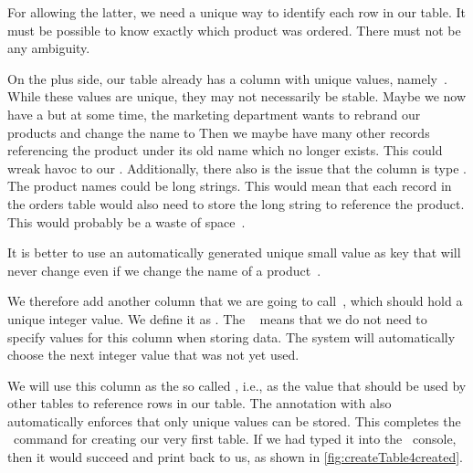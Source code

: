 For allowing the latter, we need a unique way to identify each row in our table.
It must be possible to know exactly which product was ordered.
There must not be any ambiguity.

On the plus side, our table already has a column with unique values, namely~.
While these values are unique, they may not necessarily be stable.
Maybe we now have a  but at some time, the marketing department wants to rebrand our products and change the name to 
Then we maybe have many other records referencing the product under its old name which no longer exists.
This could wreak havoc to our \db.
Additionally, there also is the issue that the column  is type .
The product names could be long strings.
This would mean that each record in the orders table would also need to store the long  string to reference the product.
This would probably be a waste of space~\cite{SE:DA:2014VPKM}.

It is better to use an automatically generated unique small value as key that will never change even if we change the name of a product~\cite{B2025DS:SBPASG}.%
%
\begin{sloppypar}%
We therefore add another column that we are going to call~, which should hold a unique integer value.
We define it as .
The ~\cite{PGDG:PD:IC,PGDG:PD:GC} means that we do not need to specify values for this column when storing data.
The system will automatically choose the next integer value that was not yet used.%
\end{sloppypar}%
%
We will use this column as the so called , i.e., as the value that should be used by other tables to reference rows in our  table.
The annotation with  also automatically enforces that only unique values can be stored.%
%
%
%
%
%
This completes the \sql\ command for creating our very first table.
If we had typed it into the \psql\ console, then it would succeed and print  back to us, as shown in \cref{fig:createTable4created}.

